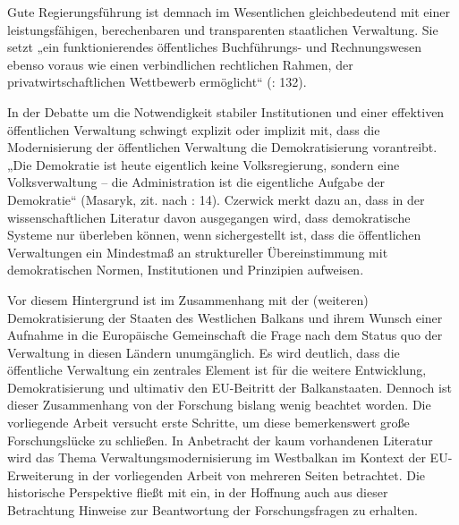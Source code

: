 Gute Regierungsführung ist demnach im Wesentlichen gleichbedeutend mit einer leistungsfähigen, berechenbaren und transparenten staatlichen Verwaltung. Sie setzt „ein funktionierendes öffentliches Buchführungs- und Rechnungswesen ebenso voraus wie einen verbindlichen rechtlichen Rahmen, der privatwirtschaftlichen Wettbewerb ermöglicht“ (\cite{schmitz09}: 132).
\par
In der Debatte um die Notwendigkeit stabiler Institutionen und einer effektiven öffentlichen Verwaltung schwingt explizit oder implizit mit, dass die Modernisierung der öffentlichen Verwaltung die Demokratisierung vorantreibt. „Die Demokratie ist heute eigentlich keine Volksregierung, sondern eine Volksverwaltung – die Administration ist die eigentliche Aufgabe der Demokratie“ (Masaryk, zit. nach \cite{czerwick}: 14). Czerwick merkt dazu an, dass in der wissenschaftlichen Literatur davon ausgegangen wird, dass demokratische Systeme nur überleben können, wenn sichergestellt ist, dass die öffentlichen Verwaltungen ein Mindestmaß an struktureller Übereinstimmung mit demokratischen Normen, Institutionen und Prinzipien aufweisen.
\par
Vor diesem Hintergrund ist im Zusammenhang mit der (weiteren) Demokratisierung der Staaten des Westlichen Balkans und ihrem Wunsch einer Aufnahme in die Europäische Gemeinschaft die Frage nach dem Status quo der Verwaltung in diesen Ländern unumgänglich. Es wird deutlich, dass die öffentliche Verwaltung ein zentrales Element ist für die weitere Entwicklung, Demokratisierung und ultimativ den EU-Beitritt der Balkanstaaten. Dennoch ist dieser Zusammenhang von der Forschung bislang wenig beachtet worden. Die vorliegende Arbeit versucht erste Schritte, um diese bemerkenswert große Forschungslücke zu schließen. In Anbetracht der kaum vorhandenen Literatur wird das Thema Verwaltungsmodernisierung im Westbalkan im Kontext der EU-Erweiterung in der vorliegenden Arbeit von mehreren Seiten betrachtet. Die historische Perspektive fließt mit ein, in der Hoffnung auch aus dieser Betrachtung Hinweise zur Beantwortung der Forschungsfragen zu erhalten.
